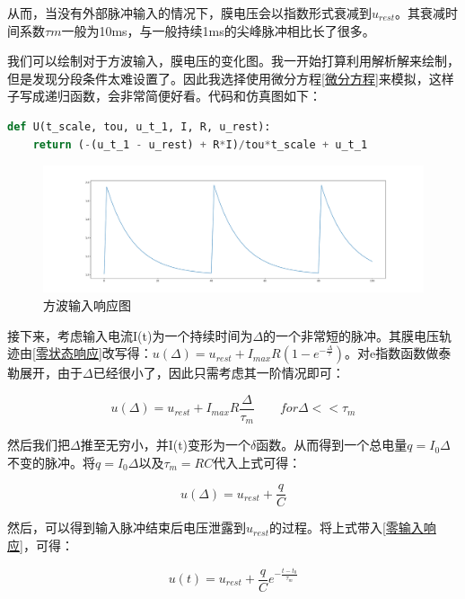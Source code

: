 \documentclass[12pt, a4paper, oneside]{ctexbook}
\begin{document}
从而，当没有外部脉冲输入的情况下，膜电压会以指数形式衰减到$u_{rest}$。其衰减时间系数$\tau m$一般为10ms，与一般持续1ms的尖峰脉冲相比长了很多。
 
我们可以绘制对于方波输入，膜电压的变化图。我一开始打算利用解析解来绘制，但是发现分段条件太难设置了。因此我选择使用微分方程\ref*{微分方程}来模拟，这样子写成递归函数，会非常简便好看。代码和仿真图如下：\\

\begin{lstlisting}[language=Python]
def U(t_scale, tou, u_t_1, I, R, u_rest):
    return (-(u_t_1 - u_rest) + R*I)/tou*t_scale + u_t_1
\end{lstlisting}

\begin{figure}[H]
    \centering
    \includegraphics[width=1\textwidth]{方波输入响应图.pdf}
    \caption{方波输入响应图}
\end{figure} 

接下来，考虑输入电流I(t)为一个持续时间为$\Delta$的一个非常短的脉冲。其膜电压轨迹由\ref*{零状态响应}改写得：$u(\Delta)=u_{rest}+I_{max}R(1-e^{-\frac{\Delta}{\tau}})$。对e指数函数做泰勒展开，由于$\Delta$已经很小了，因此只需考虑其一阶情况即可：

\begin{equation}
    u(\Delta)=u_{rest}+I_{max}R\frac{\Delta}{\tau_m}\qquad for \Delta<<\tau_m
    \label{膜电压一阶泰勒}
\end{equation}

然后我们把$\Delta$推至无穷小，并I(t)变形为一个$\delta$函数。从而得到一个总电量$q=I_0\Delta$不变的脉冲。将$q=I_0\Delta$以及$\tau_m=RC$代入上式可得：

\begin{equation}
    u(\Delta)=u_{rest}+\frac{q}{C}
    \label{狄拉克函数}
\end{equation}

然后，可以得到输入脉冲结束后电压泄露到$u_{rest}$的过程。将上式带入\ref*{零输入响应}，可得：

\begin{equation}
    u(t)=u_{rest}+\frac{q}{C}e^{-\frac{t-t_0}{\tau_m}}
    \label{脉冲响应}
\end{equation}
\end{document}
